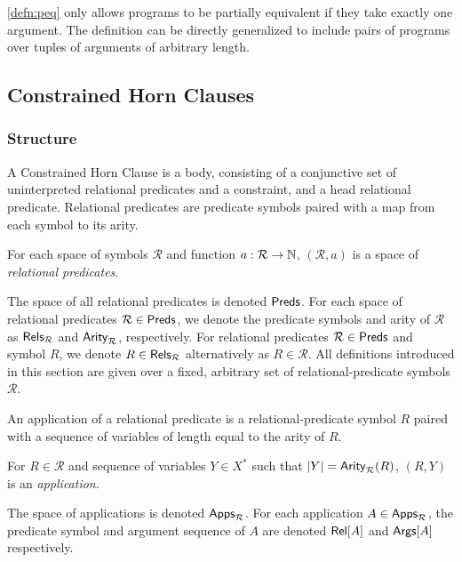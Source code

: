 \autoref{defn:peq} only allows programs to be partially equivalent if
they take exactly one argument.
%
The definition can be directly generalized to include pairs of
programs over tuples of arguments of arbitrary length.

\subsection{Constrained Horn Clauses}
\label{sec:chcs}

\subsubsection{Structure}
A Constrained Horn Clause is a body, consisting of a conjunctive set
of uninterpreted relational predicates and a constraint, and a head
relational predicate.
%
Relational predicates are predicate symbols paired with a map from
each symbol to its arity.
%
\begin{defn}
  \label{defn:rel-preds}
  For each space of symbols $\mathcal{R}$ and function $a: \mathcal{R}
  \to \mathbb{N}$, $(\mathcal{R}, a)$ is a space of \emph{relational
    predicates}.
\end{defn}
%
The space of all relational predicates is denoted $\mathsf{Preds}$.
%
For each space of relational predicates $\mathcal{R} \in \mathsf{Preds}$,
we denote the predicate symbols and arity of $\mathcal{R}$ as
$\mathsf{Rels}_{\mathcal{R}}$ and $\mathsf{Arity}_{\mathcal{R}}$, respectively.
%
For relational predicates $\mathcal{R} \in \mathsf{Preds}$ and symbol $R$,
we denote $R \in \mathsf{Rels}_{ \mathcal{R} }$ alternatively as $R \in
\mathcal{R}$.
%
All definitions introduced in this section are given over a fixed,
arbitrary set of relational-predicate symbols $\mathcal{R}$.

An application of a relational predicate is a relational-predicate
symbol $R$ paired with a sequence of variables of length equal to the
arity of $R$.
%
\begin{defn}
  \label{defn:pred-apps}
  For $R \in \mathcal{R}$ and sequence of variables $Y \in X^{*}$ such
  that $|Y| = \mathsf{Arity}_{\mathcal{R}}(R)$, $(R, Y)$ is an
  \emph{application}.
\end{defn}
%
The space of applications is denoted $\mathsf{Apps}_{\mathcal{R}}$.
%
For each application $A \in \mathsf{Apps}_{\mathcal{R}}$, the predicate symbol
and argument sequence of $A$ are denoted $\mathsf{Rel}[ A ]$ and $\mathsf{Args}[ A ]$
respectively.

